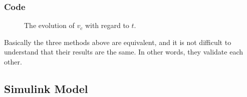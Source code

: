 \documentclass{article}
\begin{document}
  \subsubsection{Code}
  
  \begin{figure}[H]
    \centering
    \noindent{}
    \caption{The evolution of $v_c$ with regard to $t$.} \label{fig:tf}
  \end{figure}
  \par
  Basically the three methods above are equivalent, and it is not difficult to understand that their results are the same. In other words, they validate each other.
  
  \subsection{Simulink Model}
\end{document}
